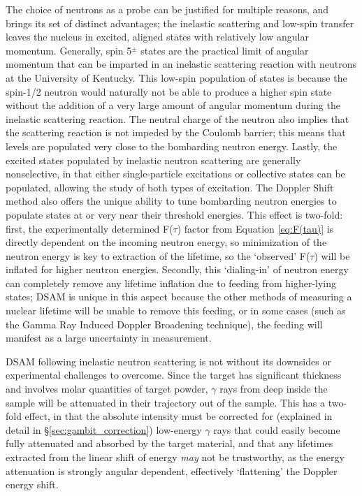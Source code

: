 The choice of neutrons as a probe can be justified for multiple reasons, and brings its set of distinct advantages; the inelastic scattering and low-spin transfer leaves the nucleus in excited, aligned states with relatively low angular momentum. Generally, spin 5$^{\pm}$ states are the practical limit of angular momentum that can be imparted in an inelastic scattering reaction with neutrons at the University of Kentucky. This low-spin population of states is because the spin-1/2 neutron would naturally not be able to produce a higher spin state without the addition of a very large amount of angular momentum during the inelastic scattering reaction. The neutral charge of the neutron also implies that the scattering reaction is not impeded by the Coulomb barrier; this means that levels are populated very close to the bombarding neutron energy. Lastly, the excited states populated by inelastic neutron scattering are generally nonselective, in that either single-particle excitations or collective states can be populated, allowing the study of both types of excitation. The Doppler Shift method also offers the unique ability to tune bombarding neutron energies to populate states at or very near their threshold energies. This effect is two-fold: first, the experimentally determined F($\tau$) factor from Equation \ref{eq:F(tau)} is directly dependent on the incoming neutron energy, so minimization of the neutron energy is key to extraction of the lifetime, so the `observed' F($\tau$) will be inflated for higher neutron energies. Secondly, this `dialing-in' of neutron energy can completely remove any lifetime inflation due to feeding from higher-lying states; DSAM is unique in this aspect because the other methods of measuring a nuclear lifetime will be unable to remove this feeding, or in some cases (such as the Gamma Ray Induced Doppler Broadening technique), the feeding will manifest as a large uncertainty in measurement.

DSAM following inelastic neutron scattering is not without its downsides or experimental challenges to overcome. Since the target has significant thickness and involves molar quantities of target powder, $\gamma$ rays from deep inside the sample will be attenuated in their trajectory out of the sample. This has a two-fold effect, in that the absolute intensity must be corrected for (explained in detail in \S \ref{sec:gambit_correction}) low-energy $\gamma$ rays that could easily become fully attenuated and absorbed by the target material, and that any lifetimes extracted from the linear shift of energy \textit{may} not be trustworthy, as the energy attenuation is strongly angular dependent, effectively `flattening' the Doppler energy shift. 

